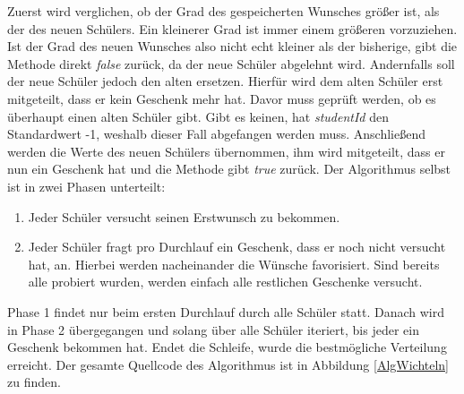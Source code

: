 \documentclass[a4paper, 12pt]{scrartcl}
\begin{document}
Zuerst wird verglichen, ob der Grad des gespeicherten Wunsches größer ist, als der des neuen Schülers. Ein kleinerer Grad ist immer einem größeren vorzuziehen. Ist der Grad des neuen Wunsches also nicht echt kleiner als der bisherige, gibt die Methode direkt \emph{false} zurück, da der neue Schüler abgelehnt wird. Andernfalls soll der neue Schüler jedoch den alten ersetzen. Hierfür wird dem alten Schüler erst mitgeteilt, dass er kein Geschenk mehr hat. Davor muss geprüft werden, ob es überhaupt einen alten Schüler gibt. Gibt es keinen, hat \emph{studentId} den Standardwert -1, weshalb dieser Fall abgefangen werden muss. Anschließend werden die Werte des neuen Schülers übernommen, ihm wird mitgeteilt, dass er nun ein Geschenk hat und die Methode gibt \emph{true} zurück. Der Algorithmus selbst ist in zwei Phasen unterteilt:
\begin{enumerate}
    \item Jeder Schüler versucht seinen Erstwunsch zu bekommen.
    \item Jeder Schüler fragt pro Durchlauf ein Geschenk, dass er noch nicht versucht hat, an. Hierbei werden nacheinander die Wünsche favorisiert. Sind bereits alle probiert wurden, werden einfach alle restlichen Geschenke versucht.
\end{enumerate}
Phase 1 findet nur beim ersten Durchlauf durch alle Schüler statt. Danach wird in Phase 2 übergegangen und solang über alle Schüler iteriert, bis jeder ein Geschenk bekommen hat. Endet die Schleife, wurde die bestmögliche Verteilung erreicht. Der gesamte Quellcode des Algorithmus ist in Abbildung \ref{AlgWichteln} zu finden.
\end{document}
